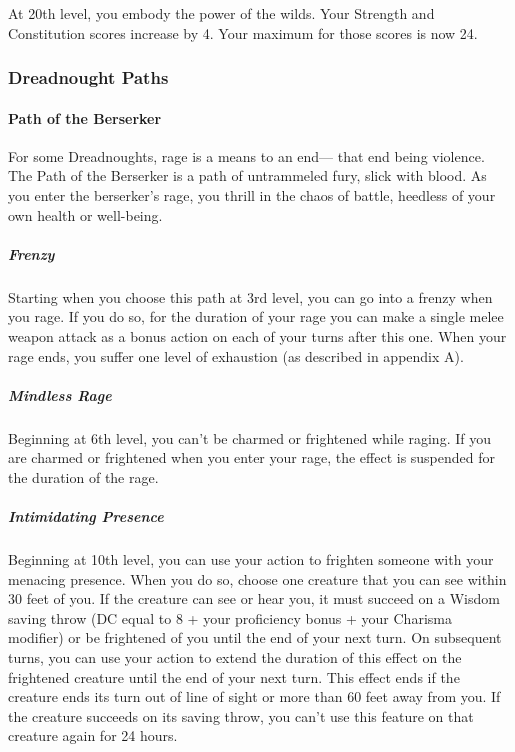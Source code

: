 At 20th level, you embody the power of the wilds. Your Strength and
Constitution scores increase by 4. Your maximum for those scores is now
24.

\subsubsection{Dreadnought Paths}\label{dreadnought-subclasses}

\paragraph{Path of the Berserker}\label{dreadnought-subclasse-berserker}

For some Dreadnoughts, rage is a means to an end--- that end being
violence. The Path of the Berserker is a path of untrammeled fury, slick
with blood. As you enter the berserker's rage, you thrill in the chaos
of battle, heedless of your own health or well-being.

\subparagraph{Frenzy}\label{dreadnought-subclasse-berserker-feature-frenzy}

Starting when you choose this path at 3rd level, you can go into a
frenzy when you rage. If you do so, for the duration of your rage you
can make a single melee weapon attack as a bonus action on each of your
turns after this one. When your rage ends, you suffer one level of
exhaustion (as described in appendix A).

\subparagraph{Mindless
Rage}\label{dreadnought-subclasse-berserker-feature-mindless-rage}

Beginning at 6th level, you can't be charmed or frightened while raging.
If you are charmed or frightened when you enter your rage, the effect is
suspended for the duration of the rage.

\subparagraph{Intimidating
Presence}\label{dreadnought-subclasse-berserker-feature-intimidating-resence}

Beginning at 10th level, you can use your action to frighten someone
with your menacing presence. When you do so, choose one creature that
you can see within 30 feet of you. If the creature can see or hear you,
it must succeed on a Wisdom saving throw (DC equal to 8 + your
proficiency bonus + your Charisma modifier) or be frightened of you
until the end of your next turn. On subsequent turns, you can use your
action to extend the duration of this effect on the frightened creature
until the end of your next turn. This effect ends if the creature ends
its turn out of line of sight or more than 60 feet away from you. If the
creature succeeds on its saving throw, you can't use this feature on
that creature again for 24 hours.

